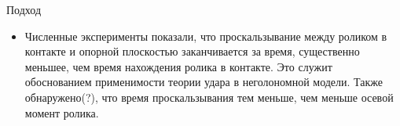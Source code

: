 \begin{frame}{Подход}
\begin{itemize}
{        }
        \item {
            Численные эксперименты показали, что проскальзывание между роликом в контакте и опорной плоскостью заканчивается за время, существенно меньшее, чем время нахождения ролика в контакте. Это служит обоснованием применимости теории удара в неголономной модели. Также обнаружено(?), что время проскальзывания тем меньше, чем меньше осевой момент ролика.
        }
    \end{itemize}
\end{frame}

